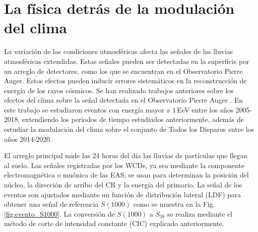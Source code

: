 
\section{La física detrás de la modulación del clima}\label{seccion:fisica_clima}

La variación de las condiciones atmosféricas afecta las señales de las lluvias atmosféricas extendidas. Estas señales pueden ser detectadas en la superficie por un arreglo de detectores, como los que se encuentran en el Observatorio Pierre Auger. Estos efectos pueden inducir errores sistemáticos en la reconstrucción de energía de los rayos cósmicos. Se han realizado  trabajos anteriores sobre los efectos del clima sobre la señal detectada en el Observatorio Pierre Auger \cite{aab2017impact} \cite{collaboration2009atmospheric} . En este trabajo se estudiaron eventos con energía mayor a $1\,$EeV entre los años 2005-2018, extendiendo los periodos de tiempo estudiados anteriormente, además de estudiar la modulación del clima sobre el conjunto  de Todos los Disparos entre los años 2014-2020.


El arreglo principal mide las 24 horas del día las lluvias de partículas que llegan al suelo. Las señales registradas por los WCDs, ya sea mediante la componente electromagnética o muónica de las EAS, se usan para determinan la posición del núcleo, la dirección de arribo del CR y la energía del primario. La señal de los eventos son ajustados mediante un función de distribución lateral (LDF) para obtener una señal de referencia $S(1000)$ como se muestra en la Fig.\ref{fig:evento_S1000}.
La conversión de $S(1000)$ a $S_{38}$ se realiza mediante el método de corte de intensidad constante (CIC) explicado anteriormente.%

